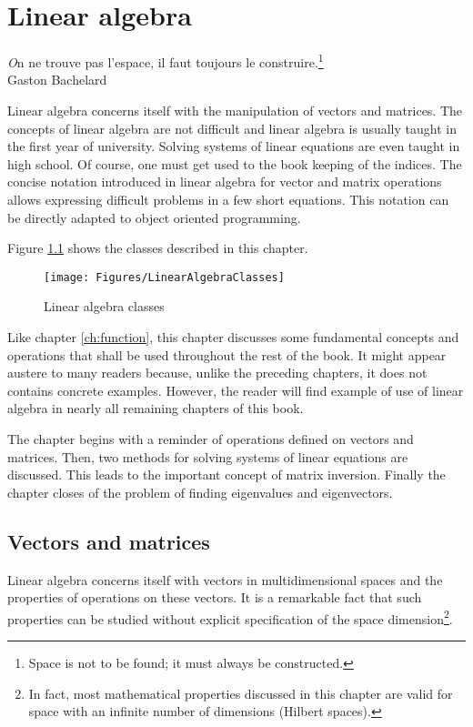 %
%

\chapter{Linear algebra}
\label{ch:linearalgebra}
\begin{flushright}
{\textsl On ne trouve pas l'espace, il faut toujours le construire.}\footnote{Space is not to be found; it must always be
constructed.}\\ Gaston Bachelard
\end{flushright}
\vspace{1 ex} Linear algebra concerns itself with the manipulation of vectors and matrices.
The concepts of linear algebra are not difficult and linear algebra is usually taught in the first year of university.
Solving systems of linear equations are even taught in high school. Of course, one must get used to the book keeping of the indices.
The concise notation introduced in linear algebra for vector and matrix operations allows expressing difficult problems in a few short equations.
This notation can be directly adapted to object oriented programming.

Figure \ref{fig:linearalgebraclasses} shows the classes described
in this chapter.
\begin{figure}
\centering\texttt{[image: Figures/LinearAlgebraClasses]}
\caption{Linear algebra classes}\label{fig:linearalgebraclasses}
\end{figure}
Like chapter \ref{ch:function}, this chapter discusses some fundamental concepts and operations that shall be used throughout
the rest of the book.
It might appear austere to many readers because, unlike the preceding chapters, it does not contains concrete examples.
However, the reader will find example of use of linear algebra in nearly all remaining chapters of this book.

The chapter begins with a reminder of operations defined on
vectors and matrices. Then, two methods for solving systems of
linear equations are discussed. This leads to the important
concept of matrix inversion. Finally the chapter closes of the
problem of finding eigenvalues and eigenvectors.

\section{Vectors and matrices}
\label{sec:linearalgebra} Linear algebra concerns itself with
vectors in multidimensional spaces and the properties of
operations on these vectors. It is a remarkable fact that such
properties can be studied without explicit specification of the
space dimension\footnote{In fact, most mathematical properties
discussed in this chapter are valid for space with an infinite
number of dimensions (Hilbert spaces).}.


